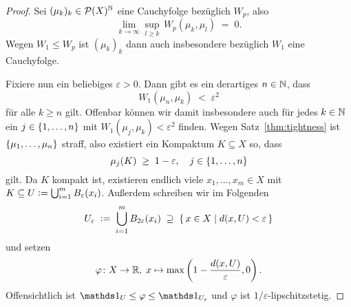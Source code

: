 \documentclass[../main/main.tex]{subfiles}
\begin{document}
	\begin{proof}
		Sei $(\mu_k)_k \in \mathcal{P}(X)^{\mathbb{N}}$ eine Cauchyfolge bezüglich $W_p$, also
		\[ \lim_{k \to \infty} \sup_{l \geq k} \, W_p(\mu_k, \mu_l) \; = \; 0 \text{.} \]
		Wegen $W_1 \leq W_p$ ist $(\mu_k)_k$ dann auch insbesondere bezüglich $W_1$ eine Cauchyfolge. 
		
		Fixiere nun ein beliebiges $\varepsilon > 0$. Dann gibt es ein derartiges $n \in \mathbb{N}$, dass 
		\[ W_1(\mu_n, \mu_k) \; < \; \varepsilon^2 \]
		für alle $k \geq n$ gilt. Offenbar können wir damit insbesondere auch für jedes $k \in \mathbb{N}$ ein $j \in \left\{1, \dots, n\right\}$ mit
		$W_1(\mu_j, \mu_k) < \varepsilon^2$ finden. Wegen Satz~\ref{thm:tightness} ist $\left\{\mu_1, \dots, \mu_n\right\}$ straff, also existiert ein Kompaktum
		$K \subseteq X$ so, dass
		\[ \mu_j(K) \; \geq \; 1 - \varepsilon, \quad j \in \left\{1, \dots, n\right\} \]
		gilt. Da $K$ kompakt ist, existieren endlich viele $x_1, \dots, x_m \in X$ mit 
		$K \subseteq U \vcentcolon = \bigcup_{i=1}^{m} B_{\varepsilon}(x_i)$.
		Außerdem schreiben wir im Folgenden 
		\[ U_{\varepsilon} \; \vcentcolon = \; \bigcup_{i=1}^{m} B_{2\varepsilon}(x_i) \; \supseteq \; \left\{\, x \in X \; \middle| \; d(x, U) < \varepsilon \,\right\} \] 
		und setzen 
		\[ \varphi \colon X \to \mathbb{R}, \; x \mapsto \max \left( 1-\frac{d(x, U)}{\varepsilon}, 0 \right)  \text{.} \]
		Offensichtlich ist $\indfct_U \leq \varphi \leq \indfct_{U_\varepsilon}$ und $\varphi$ ist $1/\varepsilon$-lipschitzstetig.
		

\end{proof}
\end{document}
